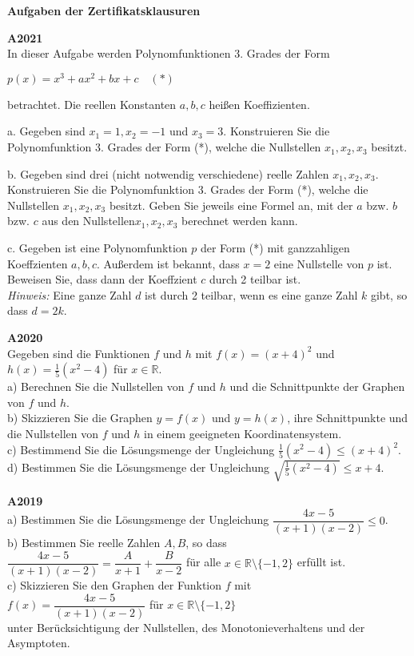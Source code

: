 \documentclass[landscape,twocolumn,a4paper]{article}
\begin{document}
\parindent 0mm


\textbf{Aufgaben der Zertifikatsklausuren}
\bigskip 

\textbf{A2021} \\
In dieser Aufgabe werden Polynomfunktionen 3. Grades der Form 

$p(x) = x^3+ax^2+bx+c \quad (*)$ 

betrachtet. Die reellen Konstanten $a, b, c$ heißen Koeffizienten.

a. Gegeben sind $x_1 = 1, x_2 = -1$ und $x_3=3$. Konstruieren Sie die Polynomfunktion 3. Grades
der Form (*), welche die Nullstellen $x_1, x_2,x_3$ besitzt. 

b. Gegeben sind drei (nicht notwendig verschiedene) reelle Zahlen $x_1, x_2,x_3$. Konstruieren Sie die
Polynomfunktion 3. Grades der Form (*), welche die Nullstellen $x_1, x_2,x_3$ besitzt. Geben Sie
jeweils eine Formel an, mit der $a$ bzw. $b$ bzw. $c$ aus den Nullstellen$x_1, x_2,x_3$ berechnet werden
kann.

c. Gegeben ist eine Polynomfunktion $p$ der Form (*) mit ganzzahligen Koeffzienten  $a , b, c$. Außerdem
 ist bekannt, dass $x = 2$ eine Nullstelle von $p$ ist. Beweisen Sie, dass dann der Koeffzient
$c$ durch 2 teilbar ist. \\
\textit{Hinweis:} Eine ganze Zahl $d$ ist durch 2 teilbar, wenn es eine ganze Zahl $k$ gibt, so dass $d = 2k$.

\bigskip

\textbf{A2020} \\
Gegeben sind die Funktionen $f$ und $h$ mit $f(x)=(x+4)^2$ und $h(x)= \frac{1}{5}(x^2-4)$ für $x \in \mathbb{R}$. \\
a) Berechnen Sie die Nullstellen von $f$ und $h$ und die Schnittpunkte der Graphen von $f$ und $h$. \\
b) Skizzieren Sie die Graphen $y = f(x)$ und $y=h(x)$, ihre Schnittpunkte und die Nullstellen von $f$ und $h$ in
einem geeigneten Koordinatensystem. \\
c) Bestimmend Sie die Lösungsmenge der Ungleichung $\frac {1}{5}(x^2-4) \le (x+4)^2$. \\
d) Bestimmen Sie die Lösungsmenge der Ungleichung $\sqrt{\frac {1}{5}(x^2-4)} \le x+4$.
\bigskip

\textbf{A2019} \\
a) Bestimmen Sie die Lösungsmenge der Ungleichung $\dfrac{4x-5}{(x+1)(x-2)} \le 0$. \\
b) Bestimmen Sie reelle Zahlen $A, B$, so dass \\
$\dfrac{4x-5}{(x+1) (x-2)} = \dfrac{A}{x+1} + \dfrac{B}{x-2}$ für alle $x \in \mathbb{R} \setminus \{-1,2\}$
erfüllt ist. \\
c) Skizzieren Sie den Graphen der Funktion $f$ mit \\
$f(x) = \dfrac{4x-5}{(x+1) (x-2)} $ für $x \in \mathbb{R} \setminus \{-1,2\}$ \\
unter Berücksichtigung der Nullstellen, des Monotonieverhaltens und der Asymptoten.
\bigskip
\end{document}
